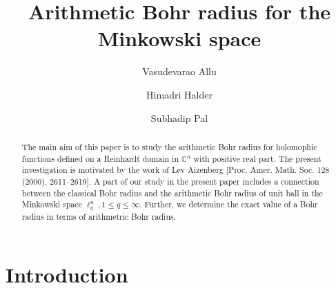 \documentclass[a4paper,12pt]{amsart}
\theoremstyle{definition}
\newcounter{minutes}\setcounter{minutes}{\time}
\newcounter{hours}\setcounter{hours}{\time}
\begin{document}
\title{Arithmetic Bohr radius for the Minkowski space}


\author{Vasudevarao Allu}
\address{Vasudevarao Allu,
	Department of Mathematics,
School of Basic Sciences,
Indian Institute of Technology Bhubaneswar,
Bhubaneswar-752050, Odisha, India.}

\author{Himadri Halder}
\address{Himadri Halder,
Department of Mathematics,
Indian Institute of Technology Bombay, Powai, Mumbai,
Maharashtra-400076, India.}

\author{Subhadip Pal}
\address{Subhadip Pal,
	Department of Mathematics,
	School of Basic Sciences,
	Indian Institute of Technology Bhubaneswar,
	Bhubaneswar-752050, Odisha, India.}




\def\thefootnote{}
 \makeatletter\def\thefootnote{\@arabic\c@footnote}\makeatother



\begin{abstract}
	The main aim of this paper is to study the arithmetic Bohr radius for holomophic functions defined on a Reinhardt domain in $\mathbb{C}^n$ with positive real part. The present investigation is motivated by the work of Lev Aizenberg [Proc. Amer. Math. Soc. 128 (2000), 2611--2619]. A part of our study in the present paper includes a connection between the classical Bohr radius and the arithmetic Bohr radius of unit ball in the Minkowski space $\ell^n_{q}\, , 1\leq q\leq \infty$. Further, we determine the exact value of a Bohr radius in terms of arithmetric Bohr radius.

\end{abstract}



\maketitle
\pagestyle{myheadings}

\section{Introduction}
\end{document}
